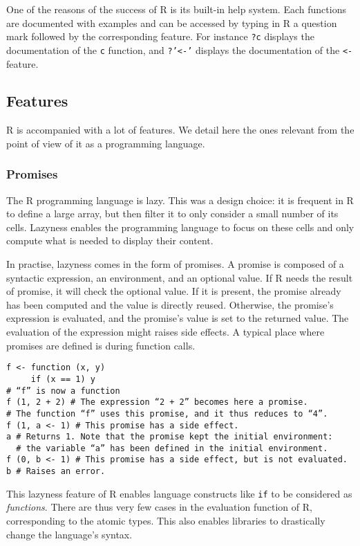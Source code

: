 \documentclass{article}
\newcommand\R{R}
\begin{document}
One of the reasons of the success of \R{}
is its built-in help system.
Each functions are documented with examples
and can be accessed by typing in \R{}
a question mark followed by the corresponding feature.
For instance \texttt{?c} displays
the documentation of the \texttt{c} function,
and \texttt{?'<-'} displays the documentation
of the \texttt{<-} feature.

\subsection{Features}
\label{sec:features}

\R{} is accompanied with a lot of features.
We detail here the ones relevant from the point of view
of it as a programming language.

\subsubsection{Promises}
\label{sec:promises}

The \R{} programming language is lazy.
This was a design choice:
it is frequent in \R{} to define a large array,
but then filter it to only consider a small number of its cells.
Lazyness enables the programming language to focus on these cells
and only compute what is needed to display their content.

In practise, lazyness comes in the form of promises.
A promise is composed of a syntactic expression,
an environment, and an optional value.
If \R{} needs the result of promise,
it will check the optional value.
If it is present, the promise already has been computed
and the value is directly reused.
Otherwise, the promise's expression is evaluated,
and the promise's value is set to the returned value.
The evaluation of the expression might raises side effects.
%
A typical place where promises are defined
is during function calls.
\begin{verbatim}
f <- function (x, y)
     if (x == 1) y
# “f” is now a function
f (1, 2 + 2) # The expression “2 + 2” becomes here a promise.
# The function “f” uses this promise, and it thus reduces to “4”.
f (1, a <- 1) # This promise has a side effect.
a # Returns 1. Note that the promise kept the initial environment:
  # the variable “a” has been defined in the initial environment.
f (0, b <- 1) # This promise has a side effect, but is not evaluated.
b # Raises an error.
\end{verbatim}

This lazyness feature of \R{} enables
language constructs like \texttt{if}
to be considered as \emph{functions}.
There are thus very few cases in the evaluation function
of \R{}, corresponding to the atomic types.
This also enables libraries to drastically change
the language's syntax.
\end{document}
